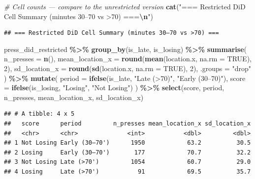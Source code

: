 \documentclass[
]{article}
\newenvironment{Shaded}{\begin{snugshade}}{\end{snugshade}}
\newcommand{\AttributeTok}[1]{\textcolor[rgb]{0.13,0.29,0.53}{#1}}
\newcommand{\CommentTok}[1]{\textcolor[rgb]{0.56,0.35,0.01}{\textit{#1}}}
\newcommand{\ConstantTok}[1]{\textcolor[rgb]{0.56,0.35,0.01}{#1}}
\newcommand{\DecValTok}[1]{\textcolor[rgb]{0.00,0.00,0.81}{#1}}
\newcommand{\FunctionTok}[1]{\textcolor[rgb]{0.13,0.29,0.53}{\textbf{#1}}}
\newcommand{\NormalTok}[1]{#1}
\newcommand{\SpecialCharTok}[1]{\textcolor[rgb]{0.81,0.36,0.00}{\textbf{#1}}}
\newcommand{\StringTok}[1]{\textcolor[rgb]{0.31,0.60,0.02}{#1}}
\begin{document}
\begin{Shaded}
\begin{Highlighting}[]
\CommentTok{\# Cell counts — compare to the unrestricted version}
\FunctionTok{cat}\NormalTok{(}\StringTok{"=== Restricted DiD Cell Summary (minutes 30–70 vs \textgreater{}70) ===}\SpecialCharTok{\textbackslash{}n}\StringTok{"}\NormalTok{)}
\end{Highlighting}
\end{Shaded}

\begin{verbatim}
## === Restricted DiD Cell Summary (minutes 30–70 vs >70) ===
\end{verbatim}

\begin{Shaded}
\begin{Highlighting}[]
\NormalTok{press\_did\_restricted }\SpecialCharTok{\%\textgreater{}\%}
  \FunctionTok{group\_by}\NormalTok{(is\_late, is\_losing) }\SpecialCharTok{\%\textgreater{}\%}
  \FunctionTok{summarise}\NormalTok{(}
    \AttributeTok{n\_presses       =} \FunctionTok{n}\NormalTok{(),}
    \AttributeTok{mean\_location\_x =} \FunctionTok{round}\NormalTok{(}\FunctionTok{mean}\NormalTok{(location.x, }\AttributeTok{na.rm =} \ConstantTok{TRUE}\NormalTok{), }\DecValTok{2}\NormalTok{),}
    \AttributeTok{sd\_location\_x   =} \FunctionTok{round}\NormalTok{(}\FunctionTok{sd}\NormalTok{(location.x,   }\AttributeTok{na.rm =} \ConstantTok{TRUE}\NormalTok{), }\DecValTok{2}\NormalTok{),}
    \AttributeTok{.groups =} \StringTok{"drop"}
\NormalTok{  ) }\SpecialCharTok{\%\textgreater{}\%}
  \FunctionTok{mutate}\NormalTok{(}
    \AttributeTok{period =} \FunctionTok{ifelse}\NormalTok{(is\_late,   }\StringTok{"Late (\textgreater{}70\textquotesingle{})"}\NormalTok{,    }\StringTok{"Early (30–70\textquotesingle{})"}\NormalTok{),}
    \AttributeTok{score  =} \FunctionTok{ifelse}\NormalTok{(is\_losing, }\StringTok{"Losing"}\NormalTok{,         }\StringTok{"Not Losing"}\NormalTok{)}
\NormalTok{  ) }\SpecialCharTok{\%\textgreater{}\%}
  \FunctionTok{select}\NormalTok{(score, period, n\_presses, mean\_location\_x, sd\_location\_x)}
\end{Highlighting}
\end{Shaded}

\begin{verbatim}
## # A tibble: 4 x 5
##   score      period         n_presses mean_location_x sd_location_x
##   <chr>      <chr>              <int>           <dbl>         <dbl>
## 1 Not Losing Early (30–70')      1950            63.2          30.5
## 2 Losing     Early (30–70')       177            70.7          32.2
## 3 Not Losing Late (>70')         1054            60.7          29.0
## 4 Losing     Late (>70')           91            69.5          35.7
\end{verbatim}
\end{document}
